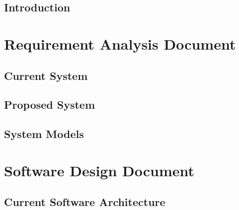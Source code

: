 \documentclass[10pt,a4paper,titlepage]{report}
\begin{document}



\tableofcontents


%



\chapter{Introduction}
\label{sec:introduction}


\part{Requirement Analysis Document}
\label{part:rad}

\chapter{Current System}
\label{sec:current_system}


\chapter{Proposed System}
\label{sec:proposed_system}


\chapter{System Models}
\label{sec:system_models}


\part{Software Design Document}
\label{part:sdd}

\chapter{Current Software Architecture}
\label{sec:current_architecture}

\end{document}
